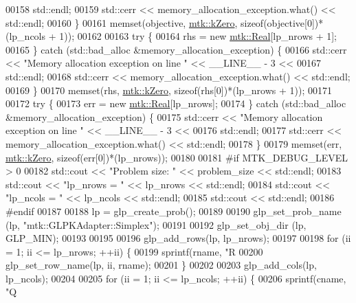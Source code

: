 \begin{DoxyCode}
00158       std::endl;
00159     std::cerr << memory\_allocation\_exception.what() << std::endl;
00160   \}
00161   memset(objective, \hyperlink{group__c01-roots_ga59a451a5fae30d59649bcda274fea271}{mtk::kZero}, \textcolor{keyword}{sizeof}(objective[0])*(lp\_ncols + 1));
00162 
00163   \textcolor{keywordflow}{try} \{
00164     rhs = \textcolor{keyword}{new} \hyperlink{group__c01-roots_gac080bbbf5cbb5502c9f00405f894857d}{mtk::Real}[lp\_nrows + 1];
00165   \} \textcolor{keywordflow}{catch} (std::bad\_alloc &memory\_allocation\_exception) \{
00166     std::cerr << \textcolor{stringliteral}{"Memory allocation exception on line "} << \_\_LINE\_\_ - 3 <<
00167       std::endl;
00168     std::cerr << memory\_allocation\_exception.what() << std::endl;
00169   \}
00170   memset(rhs, \hyperlink{group__c01-roots_ga59a451a5fae30d59649bcda274fea271}{mtk::kZero}, \textcolor{keyword}{sizeof}(rhs[0])*(lp\_nrows + 1));
00171 
00172   \textcolor{keywordflow}{try} \{
00173     err = \textcolor{keyword}{new} \hyperlink{group__c01-roots_gac080bbbf5cbb5502c9f00405f894857d}{mtk::Real}[lp\_nrows];
00174   \} \textcolor{keywordflow}{catch} (std::bad\_alloc &memory\_allocation\_exception) \{
00175     std::cerr << \textcolor{stringliteral}{"Memory allocation exception on line "} << \_\_LINE\_\_ - 3 <<
00176       std::endl;
00177     std::cerr << memory\_allocation\_exception.what() << std::endl;
00178   \}
00179   memset(err, \hyperlink{group__c01-roots_ga59a451a5fae30d59649bcda274fea271}{mtk::kZero}, \textcolor{keyword}{sizeof}(err[0])*(lp\_nrows));
00180 
00181 \textcolor{preprocessor}{  #if MTK\_DEBUG\_LEVEL > 0}
00182   std::cout << \textcolor{stringliteral}{"Problem size: "} << problem\_size << std::endl;
00183   std::cout << \textcolor{stringliteral}{"lp\_nrows = "} << lp\_nrows << std::endl;
00184   std::cout << \textcolor{stringliteral}{"lp\_ncols = "} << lp\_ncols << std::endl;
00185   std::cout << std::endl;
00186 \textcolor{preprocessor}{  #endif}
00187 
00188   lp = glp\_create\_prob();
00189 
00190   glp\_set\_prob\_name (lp, \textcolor{stringliteral}{"mtk::GLPKAdapter::Simplex"});
00191 
00192   glp\_set\_obj\_dir (lp, GLP\_MIN);
00193 
00195 
00196   glp\_add\_rows(lp, lp\_nrows);
00197 
00198   \textcolor{keywordflow}{for} (ii = 1; ii <= lp\_nrows; ++ii) \{
00199     sprintf(rname, \textcolor{stringliteral}{"R%
00200     glp\_set\_row\_name(lp, ii, rname);
00201   \}
00202 
00203   glp\_add\_cols(lp, lp\_ncols);
00204 
00205   \textcolor{keywordflow}{for} (ii = 1; ii <= lp\_ncols; ++ii) \{
00206     sprintf(cname, \textcolor{stringliteral}{"Q%
}}
\end{DoxyCode}

